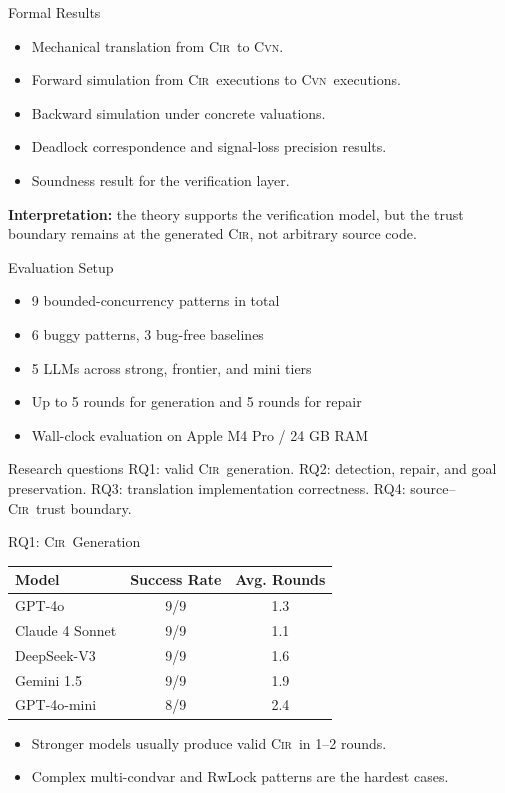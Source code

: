 \documentclass[aspectratio=169]{beamer}
\newcommand{\Cir}{\textsc{Cir}}
\newcommand{\Cvn}{\textsc{Cvn}}
\begin{document}
\begin{frame}{Formal Results}
  \begin{itemize}
    \item Mechanical translation from \Cir\ to \Cvn.
    \item Forward simulation from \Cir\ executions to \Cvn\ executions.
    \item Backward simulation under concrete valuations.
    \item Deadlock correspondence and signal-loss precision results.
    \item Soundness result for the verification layer.
  \end{itemize}
  \vspace{0.4em}
  \textbf{Interpretation:} the theory supports the verification model, but the trust boundary remains at the generated \Cir, not arbitrary source code.
\end{frame}

\begin{frame}{Evaluation Setup}
  \begin{itemize}
    \item 9 bounded-concurrency patterns in total
    \item 6 buggy patterns, 3 bug-free baselines
    \item 5 LLMs across strong, frontier, and mini tiers
    \item Up to 5 rounds for generation and 5 rounds for repair
    \item Wall-clock evaluation on Apple M4 Pro / 24 GB RAM
  \end{itemize}
  \begin{block}{Research questions}
    RQ1: valid \Cir\ generation. \quad
    RQ2: detection, repair, and goal preservation. \quad
    RQ3: translation implementation correctness. \quad
    RQ4: source--\Cir\ trust boundary.
  \end{block}
\end{frame}

\begin{frame}{RQ1: \Cir\ Generation}
  \begin{table}
    \centering
    \footnotesize
    \begin{tabular}{@{}lcc@{}}
      \toprule
      Model & Success Rate & Avg. Rounds \\
      \midrule
      GPT-4o & 9/9 & 1.3 \\
      Claude 4 Sonnet & 9/9 & 1.1 \\
      DeepSeek-V3 & 9/9 & 1.6 \\
      Gemini 1.5 & 9/9 & 1.9 \\
      GPT-4o-mini & 8/9 & 2.4 \\
      \bottomrule
    \end{tabular}
  \end{table}
  \begin{itemize}
    \item Stronger models usually produce valid \Cir\ in 1--2 rounds.
    \item Complex multi-condvar and RwLock patterns are the hardest cases.
  \end{itemize}
\end{frame}
\end{document}
